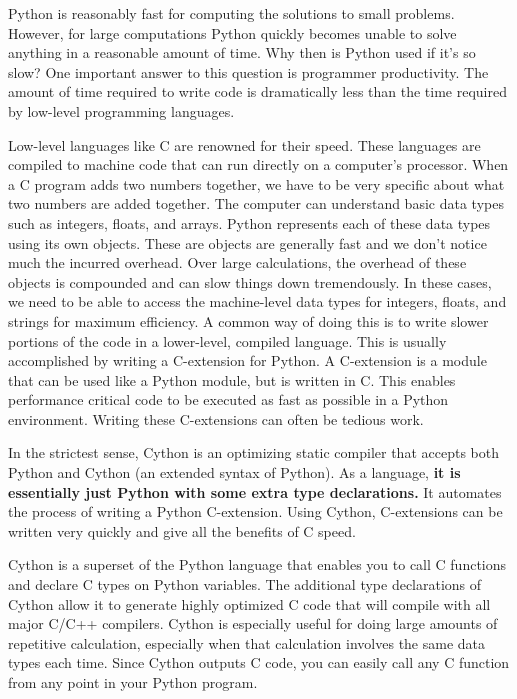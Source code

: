 \label{lab:Cython}

Python is reasonably fast for computing the solutions to small problems.
However, for large computations Python quickly becomes unable to solve anything in a reasonable amount of time.
Why then is Python used if it's so slow?  One important answer to this question is programmer productivity.
The amount of time required to write code is dramatically less than the time required by low-level programming languages. 

Low-level languages like C are renowned for their speed.  These languages are compiled to machine code that can run directly on a computer's processor.
When a C program adds two numbers together, we have to be very specific about what two numbers are added together.
The computer can understand basic data types such as integers, floats, and arrays.
Python represents each of these data types using its own objects.
These are objects are generally fast and we don't notice much the incurred overhead.
Over large calculations, the overhead of these objects is compounded and can slow things down tremendously.
In these cases, we need to be able to access the machine-level data types for integers, floats, and strings for maximum efficiency.
A common way of doing this is to write slower portions of the code in a lower-level, compiled language.
This is usually accomplished by writing a C-extension for Python.
A C-extension is a module that can be used like a Python module, but is written in C.
This enables performance critical code to be executed as fast as possible in a Python environment.
Writing these C-extensions can often be tedious work.

In the strictest sense, Cython is an optimizing static compiler that accepts both Python and Cython (an extended syntax of Python).
As a language, \textbf{it is essentially just Python with some extra type declarations.}
It automates the process of writing a Python C-extension. Using Cython, C-extensions can be written very quickly and give all the benefits of C speed. 

Cython is a superset of the Python language that enables you to call C functions and declare C types on Python variables.
The additional type declarations of Cython allow it to generate highly optimized C code that will compile with all major C/C++ compilers.
Cython is especially useful for doing large amounts of repetitive calculation, especially when that calculation involves the same data types each time.
Since Cython outputs C code, you can easily call any C function from any point in your Python program.


